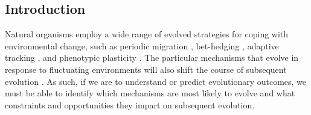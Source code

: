 \documentclass[utf8]{frontiersSCNS} %
\begin{document}
\begin{raggedbottom}


\section{Introduction}

Natural organisms employ a wide range of evolved strategies for coping with environmental change, such as
periodic migration \citep{winger_long_2019},
bet-hedging \citep{beaumont_experimental_2009},
adaptive tracking \citep{barrett_adaptation_2008},
and phenotypic plasticity \citep{ghalambor_adaptive_2007}.
The particular mechanisms that evolve in response to fluctuating environments will also shift the course of subsequent evolution \citep{wennersten_population-level_2012,schaum_plasticity_2014}.
As such, if we are to understand or predict evolutionary outcomes, we must be able to identify which mechanisms are most likely to evolve and what constraints and opportunities they impart on subsequent evolution.


\end{raggedbottom}
\end{document}
